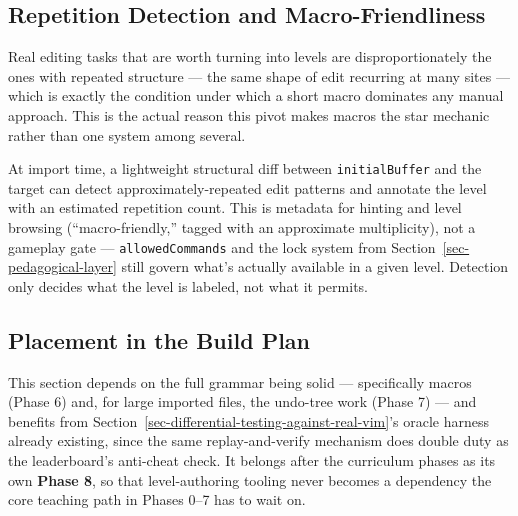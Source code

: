 \documentclass[11pt]{article}
\begin{document}
\hypertarget{sec-repetition-detection-and-macro-friendliness}{%
\subsection{Repetition Detection and Macro-Friendliness}\label{sec-repetition-detection-and-macro-friendliness}}

Real editing tasks that are worth turning into levels are disproportionately
the ones with repeated structure --- the same shape of edit recurring at many
sites --- which is exactly the condition under which a short macro dominates
any manual approach. This is the actual reason this pivot makes macros the
star mechanic rather than one system among several.

At import time, a lightweight structural diff between \texttt{initialBuffer} and
the target can detect approximately-repeated edit patterns and annotate the
level with an estimated repetition count. This is metadata for hinting and
level browsing (``macro-friendly,'' tagged with an approximate multiplicity),
not a gameplay gate --- \texttt{allowedCommands} and the lock system from Section~\ref{sec-pedagogical-layer}
still govern what's actually available in a given level. Detection only
decides what the level is labeled, not what it permits.

\hypertarget{sec-placement-in-the-build-plan}{%
\subsection{Placement in the Build Plan}\label{sec-placement-in-the-build-plan}}

This section depends on the full grammar being solid --- specifically macros
(Phase 6) and, for large imported files, the undo-tree work (Phase 7) --- and
benefits from Section~\ref{sec-differential-testing-against-real-vim}'s oracle harness already existing, since the same
replay-and-verify mechanism does double duty as the leaderboard's anti-cheat
check. It belongs after the curriculum phases as its own \textbf{Phase 8}, so
that level-authoring tooling never becomes a dependency the core teaching
path in Phases 0--7 has to wait on.
\end{document}
